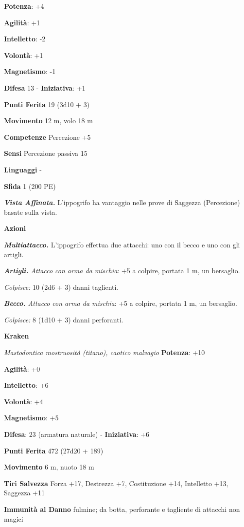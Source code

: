 \begin{multicols}{2}
\textbf{Potenza}: +4

\textbf{Agilità}: +1

\textbf{Intelletto}: -2

\textbf{Volontà}: +1

\textbf{Magnetismo}: -1

\textbf{Difesa} 13 - \textbf{Iniziativa}: +1

\textbf{Punti Ferita} 19 (3d10 + 3)

\textbf{Movimento} 12 m, volo 18 m

\textbf{Competenze} Percezione +5

\textbf{Sensi} Percezione passiva 15

\textbf{Linguaggi} -

\textbf{Sfida} 1 (200 PE)\smallskip

\emph{\textbf{Vista Affinata.}} L'ippogrifo ha vantaggio nelle prove di
Saggezza (Percezione) basate sulla vista.

\smallskip\textbf{Azioni}

\emph{\textbf{Multiattacco.}} L'ippogrifo effettua due attacchi: uno con
il becco e uno con gli artigli.

\emph{\textbf{Artigli.} Attacco con arma da mischia}: +5 a colpire,
portata 1 m, un bersaglio.

\emph{Colpisce:} 10 (2d6 + 3) danni taglienti.

\emph{\textbf{Becco.} Attacco con arma da mischia}: +5 a colpire,
portata 1 m, un bersaglio.

\emph{Colpisce:} 8 (1d10 + 3) danni perforanti.

\textbf{Kraken}

\emph{Mastodontica mostruosità (titano), caotico malvagio}
\textbf{Potenza}: +10

\textbf{Agilità}: +0

\textbf{Intelletto}: +6

\textbf{Volontà}: +4

\textbf{Magnetismo}: +5

\textbf{Difesa}: 23 (armatura naturale) - \textbf{Iniziativa}: +6

\textbf{Punti Ferita} 472 (27d20 + 189) 

\textbf{Movimento} 6 m, nuoto 18 m

\textbf{Tiri Salvezza} Forza +17, Destrezza +7, Costituzione +14,
Intelletto +13, Saggezza +11

\textbf{Immunità al Danno} fulmine; da botta, perforante e tagliente
di attacchi non magici


\end{multicols}
